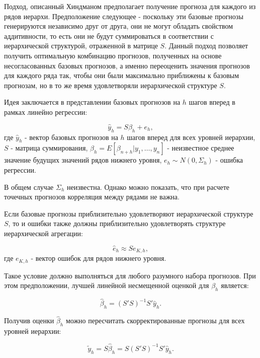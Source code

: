 \documentclass[12pt,a4paper, oneside]{extreport}
\begin{document}
Подход, описанный Хиндманом\cite{hyndman2016fast} предполагает получение прогноза для  каждого из рядов иерархи. Предположение следующее - поскольку эти базовые прогнозы генерируются независимо друг от друга,  они не могут обладать свойством аддитивности, то есть они не  будут суммироваться в соответствии с иерархической структурой, отраженной в матрице $S$. Данный подход позволяет получить оптимальную комбинацию прогнозов, полученных на основе несогласованных базовых прогнозов,  а именно переоценить значения прогнозов для каждого ряда так, чтобы они были максимально приближены к базовым прогнозам, но в то же время удовлетворяли   иерархической структуре $S$. 


Идея заключается в представлении
базовых прогнозов на $h$ шагов вперед в рамках линейно регрессии:


\begin{equation}\label{key}
 \hat{y}_h = S \beta_h + e_h  ,
\end{equation}
\noindent
где $ \hat{y}_h $ - вектор базовых прогнозов  на $h$ шагов вперед для всех уровней иерархии, $S$ -  матрица суммирования, 
$ \beta_h = E [ \beta_{n + h} | y_1 , \dots , y_n ]  $
-  неизвестное среднее значение будущих значений рядов нижнего уровня, 
$ e_h \sim N(0,\Sigma_h ) $ - ошибка регрессии. 

В общем случае $\Sigma_h$ неизвестна. Однако можно показать, что при расчете точечных прогнозов корреляция между рядами не важна. 

Если базовые прогнозы приблизительно удовлетворяют  иерархической структуре $S$, то и ошибки также должны приблизительно удовлетворять структуре иерархической агрегации:

\begin{equation}\label{key}
\hat{e}_h \approx S  e_{K,h}  ,
\end{equation}
\noindent
где $e_{K,h}$  - вектор ошибок для рядов нижнего уровня. 

Такое условие  должно выполняться  для любого разумного набора прогнозов. 
При этом предположении,  лучшей  линейной несмещенной оценкой   для $\beta_h$ является:

\begin{equation}\label{key}
\hat{\beta}_h = ( S'  S )^{-1}  S'    \hat{y}_h .
\end{equation}

Получив оценки $\hat{\beta}_h $ можно пересчитать скорректированные прогнозы для всех уровней иерархии:

\begin{equation}\label{key555}
 \tilde{y}_h
= S \hat{\beta}_h  = S ( S'  S )^{-1}  S'    \hat{y}_h .
\end{equation}
 
\end{document}
